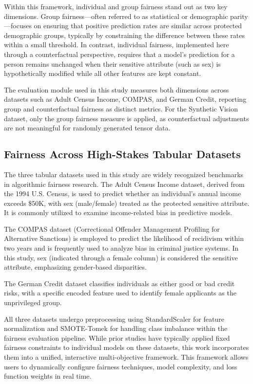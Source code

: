 \documentclass[12pt,a4paper]{article}
\begin{document}
Within this framework, individual and group fairness stand out as two key dimensions. Group fairness—often referred to as statistical or demographic parity—focuses on ensuring that positive prediction rates are similar across protected demographic groups, typically by constraining the difference between these rates within a small threshold. In contrast, individual fairness, implemented here through a counterfactual perspective, requires that a model’s prediction for a person remains unchanged when their sensitive attribute (such as sex) is hypothetically modified while all other features are kept constant.

The evaluation module used in this study measures both dimensions across datasets such as Adult Census Income, COMPAS, and German Credit, reporting group and counterfactual fairness as distinct metrics. For the Synthetic Vision dataset, only the group fairness measure is applied, as counterfactual adjustments are not meaningful for randomly generated tensor data.
\subsection{Fairness Across High-Stakes Tabular Datasets}
The three tabular datasets used in this study are widely recognized benchmarks in algorithmic fairness research. The Adult Census Income dataset, derived from the 1994 U.S. Census, is used to predict whether an individual’s annual income exceeds \$50K, with sex (male/female) treated as the protected sensitive attribute. It is commonly utilized to examine income-related bias in predictive models.

The COMPAS dataset (Correctional Offender Management Profiling for Alternative Sanctions) is employed to predict the likelihood of recidivism within two years and is frequently used to analyze bias in criminal justice systems. In this study, sex (indicated through a female column) is considered the sensitive attribute, emphasizing gender-based disparities.

The German Credit dataset classifies individuals as either good or bad credit risks, with a specific encoded feature used to identify female applicants as the unprivileged group.

All three datasets undergo preprocessing using StandardScaler for feature normalization and SMOTE-Tomek for handling class imbalance within the fairness evaluation pipeline. While prior studies have typically applied fixed fairness constraints to individual models on these datasets, this work incorporates them into a unified, interactive multi-objective framework. This framework allows users to dynamically configure fairness techniques, model complexity, and loss function weights in real time.
\end{document}
